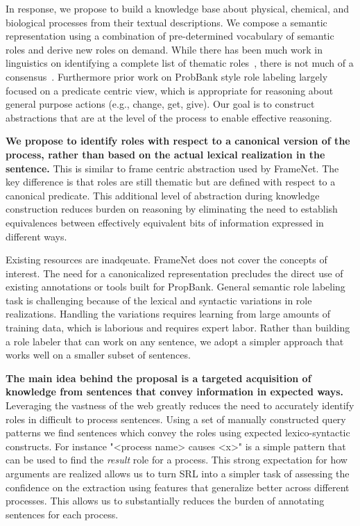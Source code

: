 In response, we propose to build a knowledge base about physical, chemical, and biological processes from their textual descriptions. 
We compose a semantic representation using a combination of pre-determined vocabulary of semantic roles and derive new roles on demand.
While there has been much work in linguistics on identifying a complete list of thematic roles~\cite{}, there is not much of a consensus~\cite{}.
Furthermore prior work on ProbBank style role labeling largely focused on a predicate centric view,
 which is appropriate for reasoning about general purpose actions (e.g., change, get, give). 
Our goal is to construct abstractions that are at the level of the process to enable effective reasoning.

{\bf We propose to identify roles with respect to a canonical version of the process, rather than based on the actual lexical realization in the sentence.}
This is similar to frame centric abstraction used by FrameNet. The key difference is that roles are still thematic but are defined with respect to a canonical predicate.
This additional level of abstraction during knowledge construction reduces burden on reasoning by eliminating the need to establish equivalences 
between effectively equivalent bits of information expressed in different ways.

Existing resources are inadqeuate. FrameNet does not cover the concepts of interest. 
The need for a canonicalized representation precludes the direct use of existing annotations or tools built for PropBank.
General semantic role labeling task is challenging because of the lexical and syntactic variations in role realizations. 
Handling the variations requires learning from large amounts of training data, which is laborious and requires expert labor.
Rather than building a role labeler that can work on any sentence, we adopt a simpler approach that works well on a smaller subset of sentences.

{\bf The main idea behind the proposal is a targeted acquisition of knowledge from sentences that convey information in expected ways.}
Leveraging the vastness of the web greatly reduces the need to accurately identify roles in difficult to process sentences.
Using a set of manually constructed query patterns we find sentences which convey the roles using expected lexico-syntactic constructs. 
For instance "<process name> causes <x>" is a simple pattern that can be used to find the {\em result} role for a process. 
This strong expectation for how arguments are realized allows us to turn SRL into a simpler task of assessing the confidence on the extraction using features that generalize better across different processes.  
This allows us to substantially reduces the burden of annotating sentences for each process.

